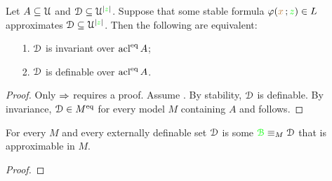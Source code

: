 \documentclass[creche.tex]{subfiles}
\begin{document}
\begin{proposition}
Let $A\subseteq\EuScript U$ and $\EuScript D\subseteq\EuScript U^{|{\color{green} z}|}$. Suppose that some stable formula $\varphi({\color{brown} x}\,;{\color{green} z})\in L$ approximates $\EuScript D\subseteq\EuScript U^{|{\color{green} z}|}$. Then the following are equivalent:
\begin{itemize}
\item[1.] $\EuScript D$ is invariant over $\mathop{\rm acl}^{{\rm eq}} A$;
\item[2.] $\EuScript D$ is definable over $\mathop{\rm acl}^{{\rm eq}} A$.
\end{itemize}
\end{proposition}

\begin{proof}
Only $\Rightarrow$ requires a proof. Assume . By stability, $\EuScript D$ is definable. By invariance, $\EuScript D\in M^{{\rm eq}}$ for every model $M$ containing $A$ and  follows.
\end{proof}


\begin{proposition}
For every $M$ and every externally definable set $\EuScript D$ is some ${\color{green}{\EuScript B}}\equiv_M\EuScript D$ that is approximable in $M$. 
\end{proposition}

\begin{proof}

\end{proof}
\end{document}
